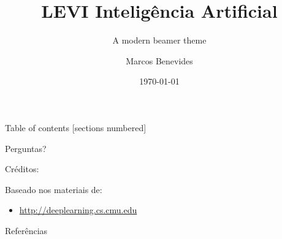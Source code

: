 \documentclass[10pt]{beamer}
\title{LEVI \- Inteligência Artificial}
\subtitle{A modern beamer theme}
\date{\today}
\author{Marcos Benevides}
\institute{Universidade Federal do Maranhão}
\theoremstyle{definition}
\begin{document}
\maketitle

\begin{frame}{Table of contents}
  [sections numbered]
  \tableofcontents%
\end{frame}








{
\begin{frame}[standout]
  Perguntas?
\end{frame}
}

\begin{frame}{Créditos:}

  Baseado nos materiais de:
  \begin{itemize}
    \item \href{http://deeplearning.cs.cmu.edu/}{http://deeplearning.cs.cmu.edu}
  \end{itemize}

\end{frame}


\begin{frame}[allowframebreaks]{Referências}

  
  

\end{frame}
\end{document}
